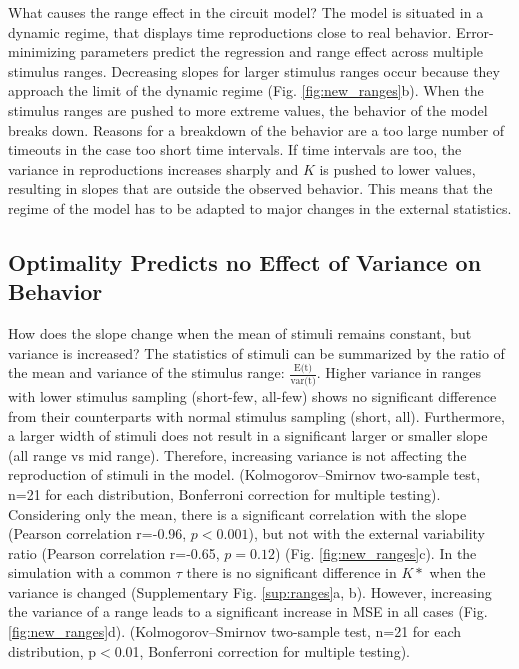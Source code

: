 \documentclass[10pt]{article}
\begin{document}
\noindent What causes the range effect in the circuit model?
The model is situated in a dynamic regime, that displays time reproductions close to real behavior.
Error-minimizing parameters predict the regression and range effect across multiple stimulus ranges.
Decreasing slopes for larger stimulus ranges occur because they approach the limit of the dynamic regime (Fig. \ref{fig:new_ranges}b).
When the stimulus ranges are pushed to more extreme values, the behavior of the model breaks down. Reasons for a breakdown of the behavior are a too large number of timeouts in the case too short time intervals. If time intervals are too, the variance in reproductions increases sharply and $K$ is pushed to lower values, resulting in slopes that are outside the observed behavior. 
This means that the regime of the model has to be adapted to major changes in the external statistics. 

\subsection{Optimality Predicts no Effect of Variance on Behavior}
How does the slope change when the mean of stimuli remains constant, but variance is increased?
The statistics of stimuli can be summarized by the ratio of the mean and variance of the stimulus range: $\frac{\text{E(t)}}{\text{var(t)}}$.
Higher variance in ranges with lower stimulus sampling (short-few, all-few) shows no significant difference from their counterparts with normal stimulus sampling (short, all).
Furthermore, a larger width of stimuli does not result in a significant larger or smaller slope (all range vs mid range).
Therefore, increasing variance is not affecting the reproduction of stimuli in the model.
(Kolmogorov–Smirnov two-sample test, n=21 for each distribution, Bonferroni correction for multiple testing).
Considering only the mean, there is a significant correlation with the slope (Pearson correlation r=-0.96, $p<0.001$), but not with the external variability ratio (Pearson correlation r=-0.65, $p=0.12$) (Fig. \ref{fig:new_ranges}c).
In the simulation with a common $\tau$ there is no significant difference in $K*$ when the variance is changed (Supplementary Fig. \ref{sup:ranges}a, b).
However, increasing the variance of a range leads to a significant increase in MSE in all cases (Fig. \ref{fig:new_ranges}d).  
(Kolmogorov–Smirnov two-sample test, n=21 for each distribution, p$<$0.01, Bonferroni correction for multiple testing).
\end{document}
